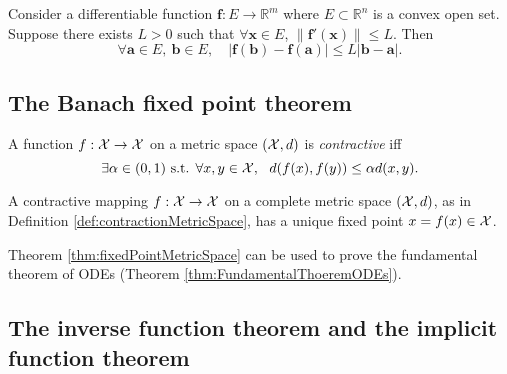 \begin{thm}
  \label{thm:C1impliesLipschitzContinuity}
  Consider a differentiable function
  $\mathbf{f}: E\rightarrow \mathbb{R}^m$
  where $E\subset \mathbb{R}^n$ is a convex open set.
  Suppose there exists $L>0$ such that
  $\forall \mathbf{x}\in E$, $\|\mathbf{f}'(\mathbf{x})\|\le L$.
  Then
  \begin{equation}
    \label{eq:C1impliesLipschitzContinuity}
    \forall \mathbf{a}\in E,\ \mathbf{b}\in E,\quad
    |\mathbf{f}(\mathbf{b})-\mathbf{f}(\mathbf{a})|
    \le L |\mathbf{b}-\mathbf{a}|. 
  \end{equation}
\end{thm}

\subsection{The Banach fixed point theorem}
\label{sec:banach-fixed-point}

\begin{defn}
  \label{def:contractionMetricSpace}
  A function $f:{\cal X}\rightarrow {\cal X}$
  on a metric space $({\cal X},d)$
  is \emph{contractive} iff
  \begin{equation}
    \label{eq:contractionMetricSpace}
    \exists \alpha\in(0,1) \text{ s.t. }
    \forall x,y\in {\cal X}, \ \ 
    d(f(x),f(y)) \le \alpha d(x,y).
  \end{equation}
\end{defn}

\begin{thm}
  \label{thm:fixedPointMetricSpace}
  A contractive mapping $f:{\cal X}\rightarrow {\cal X}$
  on a complete metric space $({\cal X},d)$, 
  as in Definition \ref{def:contractionMetricSpace}, 
  has a unique fixed point $x=f(x)\in {\cal X}$.
\end{thm}

\begin{exm}
  Theorem \ref{thm:fixedPointMetricSpace}
  can be used to prove the fundamental theorem of ODEs
  (Theorem \ref{thm:FundamentalThoeremODEs}). 
\end{exm}

\subsection{The inverse function theorem
  and the implicit function theorem}

